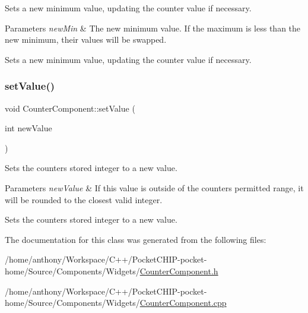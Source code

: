 Sets a new minimum value, updating the counter value if necessary.


\begin{DoxyParams}{Parameters}
{\em new\+Min} & The new minimum value. If the maximum is less than the new minimum, their values will be swapped.\\
\hline
\end{DoxyParams}
Sets a new minimum value, updating the counter value if necessary. \mbox{\label{classCounterComponent_af79e5b03bb1ead95a5108259c42bd24d}} 
\subsubsection{\texorpdfstring{set\+Value()}{setValue()}}
{\footnotesize\ttfamily void Counter\+Component\+::set\+Value (\begin{DoxyParamCaption}\item[{int}]{new\+Value }\end{DoxyParamCaption})}

Sets the counter\textquotesingle{}s stored integer to a new value.


\begin{DoxyParams}{Parameters}
{\em new\+Value} & If this value is outside of the counter\textquotesingle{}s permitted range, it will be rounded to the closest valid integer.\\
\hline
\end{DoxyParams}
Sets the counter\textquotesingle{}s stored integer to a new value. 

The documentation for this class was generated from the following files\+:\begin{DoxyCompactItemize}
\item 
/home/anthony/\+Workspace/\+C++/\+Pocket\+C\+H\+I\+P-\/pocket-\/home/\+Source/\+Components/\+Widgets/\mbox{\hyperlink{CounterComponent_8h}{Counter\+Component.\+h}}\item 
/home/anthony/\+Workspace/\+C++/\+Pocket\+C\+H\+I\+P-\/pocket-\/home/\+Source/\+Components/\+Widgets/\mbox{\hyperlink{CounterComponent_8cpp}{Counter\+Component.\+cpp}}\end{DoxyCompactItemize}
